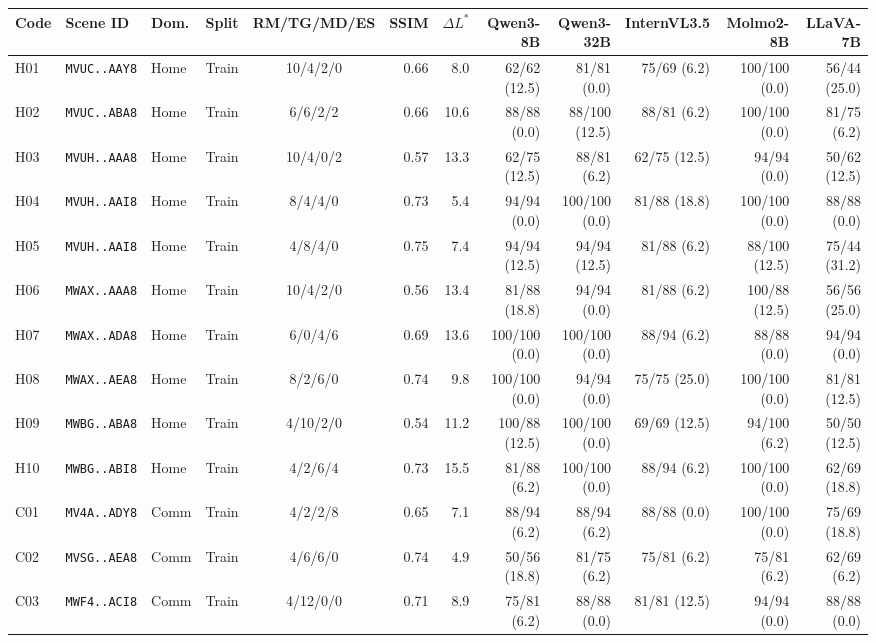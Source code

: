 \begin{tabular}{@{}llllcrrrrrrr@{}}
\toprule
Code & Scene ID & Dom. & Split & RM/TG/MD/ES & SSIM & $\Delta L^*$ & Qwen3-8B & Qwen3-32B & InternVL3.5 & Molmo2-8B & LLaVA-7B \\
\midrule
H01 & \texttt{MVUC..AAY8} & Home & Train & 10/4/2/0 & 0.66 & 8.0 & 62/62 (12.5) & 81/81 (0.0) & 75/69 (6.2) & 100/100 (0.0) & 56/44 (25.0) \\
H02 & \texttt{MVUC..ABA8} & Home & Train & 6/6/2/2 & 0.66 & 10.6 & 88/88 (0.0) & 88/100 (12.5) & 88/81 (6.2) & 100/100 (0.0) & 81/75 (6.2) \\
H03 & \texttt{MVUH..AAA8} & Home & Train & 10/4/0/2 & 0.57 & 13.3 & 62/75 (12.5) & 88/81 (6.2) & 62/75 (12.5) & 94/94 (0.0) & 50/62 (12.5) \\
H04 & \texttt{MVUH..AAI8} & Home & Train & 8/4/4/0 & 0.73 & 5.4 & 94/94 (0.0) & 100/100 (0.0) & 81/88 (18.8) & 100/100 (0.0) & 88/88 (0.0) \\
H05 & \texttt{MVUH..AAI8} & Home & Train & 4/8/4/0 & 0.75 & 7.4 & 94/94 (12.5) & 94/94 (12.5) & 81/88 (6.2) & 88/100 (12.5) & 75/44 (31.2) \\
H06 & \texttt{MWAX..AAA8} & Home & Train & 10/4/2/0 & 0.56 & 13.4 & 81/88 (18.8) & 94/94 (0.0) & 81/88 (6.2) & 100/88 (12.5) & 56/56 (25.0) \\
H07 & \texttt{MWAX..ADA8} & Home & Train & 6/0/4/6 & 0.69 & 13.6 & 100/100 (0.0) & 100/100 (0.0) & 88/94 (6.2) & 88/88 (0.0) & 94/94 (0.0) \\
H08 & \texttt{MWAX..AEA8} & Home & Train & 8/2/6/0 & 0.74 & 9.8 & 100/100 (0.0) & 94/94 (0.0) & 75/75 (25.0) & 100/100 (0.0) & 81/81 (12.5) \\
H09 & \texttt{MWBG..ABA8} & Home & Train & 4/10/2/0 & 0.54 & 11.2 & 100/88 (12.5) & 100/100 (0.0) & 69/69 (12.5) & 94/100 (6.2) & 50/50 (12.5) \\
H10 & \texttt{MWBG..ABI8} & Home & Train & 4/2/6/4 & 0.73 & 15.5 & 81/88 (6.2) & 100/100 (0.0) & 88/94 (6.2) & 100/100 (0.0) & 62/69 (18.8) \\
C01 & \texttt{MV4A..ADY8} & Comm & Train & 4/2/2/8 & 0.65 & 7.1 & 88/94 (6.2) & 88/94 (6.2) & 88/88 (0.0) & 100/100 (0.0) & 75/69 (18.8) \\
C02 & \texttt{MVSG..AEA8} & Comm & Train & 4/6/6/0 & 0.74 & 4.9 & 50/56 (18.8) & 81/75 (6.2) & 75/81 (6.2) & 75/81 (6.2) & 62/69 (6.2) \\
C03 & \texttt{MWF4..ACI8} & Comm & Train & 4/12/0/0 & 0.71 & 8.9 & 75/81 (6.2) & 88/88 (0.0) & 81/81 (12.5) & 94/94 (0.0) & 88/88 (0.0) \\

\end{tabular}

